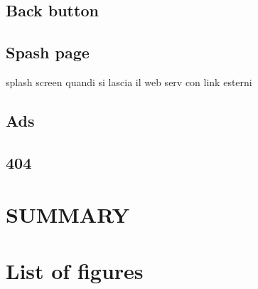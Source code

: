 \documentclass[
10pt, %
a4paper, %
oneside, %
headinclude,footinclude, %
BCOR5mm, %
]{scrartcl}
\begin{document}
	\subsection{Back button}

	\subsection{Spash page}
	splash screen quandi si lascia il web serv con link esterni


	\subsection{Ads}
	\subsection{404}


\section{SUMMARY}



\section{List of figures}







% 


\end{document}
